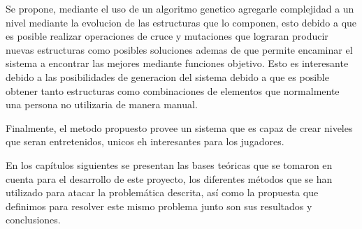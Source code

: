 
Se propone, mediante el uso de un algoritmo genetico agregarle complejidad a un
nivel mediante la evolucion de las estructuras que lo componen, esto debido a
que es posible realizar operaciones de cruce y mutaciones que lograran producir
nuevas estructuras como posibles soluciones ademas de que permite encaminar el
sistema a encontrar las mejores mediante funciones objetivo. Esto es interesante
debido a las posibilidades de generacion del sistema debido a que es posible
obtener tanto estructuras como combinaciones de elementos que normalmente una
persona no utilizaria de manera manual.

Finalmente, el metodo propuesto provee un sistema que es capaz de crear niveles
que seran entretenidos, unicos eh interesantes para los jugadores.

En los capítulos siguientes se presentan las bases teóricas que se tomaron en
cuenta para el desarrollo de este proyecto, los diferentes métodos que se han
utilizado para atacar la problemática descrita, así como la propuesta que
definimos para resolver este mismo problema junto son sus resultados y
conclusiones.